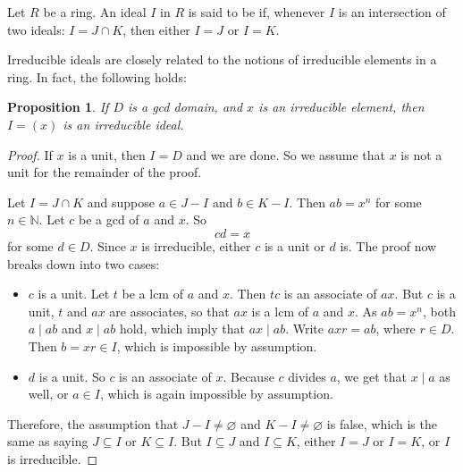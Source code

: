 \documentclass[12pt]{article}
\newtheorem{prop}{Proposition}
\begin{document}
Let $R$ be a ring.  An ideal $I$ in $R$ is said to be  if, whenever $I$ is an intersection of two ideals: $I=J\cap K$, then either $I=J$ or $I=K$.

Irreducible ideals are closely related to the notions of irreducible elements in a ring.  In fact, the following holds:



\begin{prop}
If $D$ is a gcd domain, and $x$ is an irreducible element, then $I=(x)$ is an irreducible ideal.
\end{prop}

\begin{proof}
If $x$ is a unit, then $I=D$ and we are done.  So we assume that $x$ is not a unit for the remainder of the proof.

Let $I = J\cap K$ and suppose $a\in J-I$ and $b\in K-I$.  Then $ab=x^n$ for some $n\in \mathbb{N}$.  Let $c$ be a gcd of $a$ and $x$.  So $$cd=x$$ for some $d\in D$.  Since $x$ is irreducible, either $c$ is a unit or $d$ is.  The proof now breaks down into two cases:
\begin{itemize}
\item $c$ is a unit.  Let $t$ be a lcm of $a$ and $x$.  Then $tc$ is an associate of $ax$.  But $c$ is a unit, $t$ and $ax$ are associates, so that $ax$ is a lcm of $a$ and $x$.  As $ab=x^n$, both $a\mid ab$ and $x\mid ab$ hold, which imply that $ax\mid ab$.  Write $axr=ab$, where $r\in D$.  Then $b=xr\in I$, which is impossible by assumption.
\item $d$ is a unit.  So $c$ is an associate of $x$.  Because $c$ divides $a$, we get that $x\mid a$ as well, or $a\in I$, which is again impossible by assumption.
\end{itemize}
Therefore, the assumption that $J-I\ne \varnothing$ and $K-I\ne \varnothing$ is false, which is the same as saying $J\subseteq I$ or $K\subseteq I$.  But $I\subseteq J$ and $I\subseteq K$, either $I=J$ or $I=K$, or $I$ is irreducible.
\end{proof}
\end{document}
